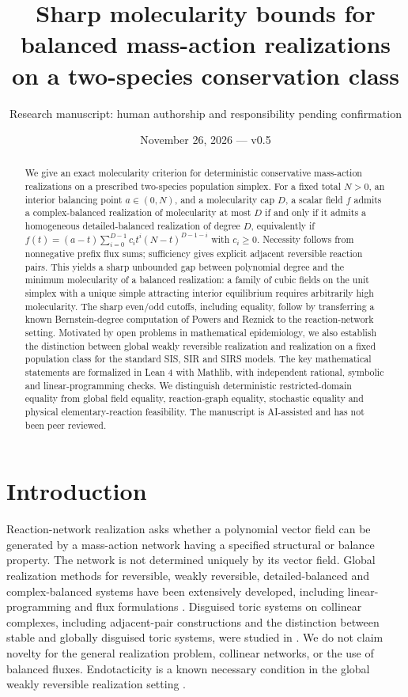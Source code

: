 \documentclass[11pt]{article}
\title{Sharp molecularity bounds for balanced mass-action realizations on a two-species conservation class}
\author{Research manuscript: human authorship and responsibility pending confirmation}
\date{November 26, 2026 --- v0.5}
\begin{document}
\maketitle
\begin{abstract}
We give an exact molecularity criterion for deterministic conservative mass-action realizations on a prescribed two-species population simplex. For a fixed total $N>0$, an interior balancing point $a\in(0,N)$, and a molecularity cap $D$, a scalar field $f$ admits a complex-balanced realization of molecularity at most $D$ if and only if it admits a homogeneous detailed-balanced realization of degree $D$, equivalently if $f(t)=(a-t)\sum_{i=0}^{D-1}c_i t^i(N-t)^{D-1-i}$ with $c_i\geq0$. Necessity follows from nonnegative prefix flux sums; sufficiency gives explicit adjacent reversible reaction pairs. This yields a sharp unbounded gap between polynomial degree and the minimum molecularity of a balanced realization: a family of cubic fields on the unit simplex with a unique simple attracting interior equilibrium requires arbitrarily high molecularity. The sharp even/odd cutoffs, including equality, follow by transferring a known Bernstein-degree computation of Powers and Reznick to the reaction-network setting. Motivated by open problems in mathematical epidemiology, we also establish the distinction between global weakly reversible realization and realization on a fixed population class for the standard SIS, SIR and SIRS models. The key mathematical statements are formalized in Lean 4 with Mathlib, with independent rational, symbolic and linear-programming checks. We distinguish deterministic restricted-domain equality from global field equality, reaction-graph equality, stochastic equality and physical elementary-reaction feasibility. The manuscript is AI-assisted and has not been peer reviewed.
\end{abstract}

\section{Introduction}
Reaction-network realization asks whether a polynomial vector field can be generated by a mass-action network having a specified structural or balance property. The network is not determined uniquely by its vector field. Global realization methods for reversible, weakly reversible, detailed-balanced and complex-balanced systems have been extensively developed, including linear-programming and flux formulations \cite{szed,efficient,realizations,boros}. Disguised toric systems on collinear complexes, including adjacent-pair constructions and the distinction between stable and globally disguised toric systems, were studied in \cite{disguised}. We do not claim novelty for the general realization problem, collinear networks, or the use of balanced fluxes. Endotacticity is a known necessary condition in the global weakly reversible realization setting \cite{kothari}.
\end{document}
